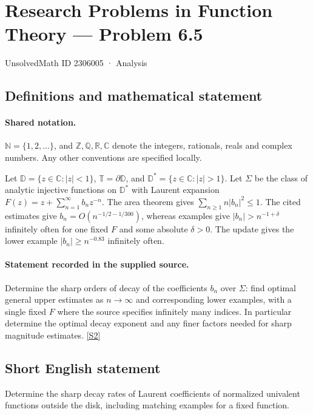 \documentclass[11pt]{book}
\newcommand{\sref}[2]{\hyperlink{source:#1:#2}{[S#2]}}
\begin{document}
\setcounter{section}{2306004}
\section{Research Problems in Function Theory — Problem 6.5}\label{2306005}
{\small\sffamily UnsolvedMath ID 2306005 · Analysis}
\subsection{Definitions and mathematical statement}

\paragraph{Shared notation.}$\mathbb N=\{1,2,\ldots\}$, and $\mathbb Z,\mathbb Q,\mathbb R,\mathbb C$ denote the integers, rationals, reals and complex numbers. Any other conventions are specified locally.


Let $\mathbb D=\{z\in\mathbb C:|z|<1\}$, $\mathbb T=\partial\mathbb D$, and $\mathbb D^*=\{z\in\mathbb C:|z|>1\}$. Let $\Sigma$ be the class of analytic injective functions on $\mathbb D^*$ with Laurent expansion $F(z)=z+\sum_{n=1}^{\infty}b_nz^{-n}$. The area theorem gives $\sum_{n\ge1}n|b_n|^2\le1$. The cited estimates give $b_n=O(n^{-1/2-1/300})$, whereas examples give $|b_n|>n^{-1+\delta}$ infinitely often for one fixed $F$ and some absolute $\delta>0$. The update gives the lower example $|b_n|\ge n^{-0.83}$ infinitely often.
\paragraph{Statement recorded in the supplied source.}
Determine the sharp orders of decay of the coefficients $b_n$ over $\Sigma$: find optimal general upper estimates as $n\to\infty$ and corresponding lower examples, with a single fixed $F$ where the source specifies infinitely many indices. In particular determine the optimal decay exponent and any finer factors needed for sharp magnitude estimates. \sref{2306005}{2}
\subsection{Short English statement}
Determine the sharp decay rates of Laurent coefficients of normalized univalent functions outside the disk, including matching examples for a fixed function.
\end{document}
